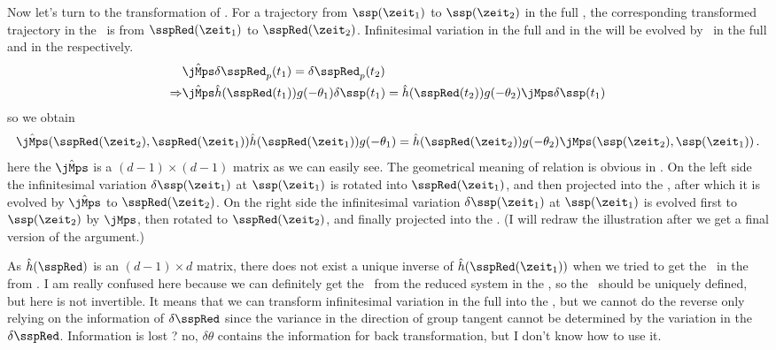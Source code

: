 Now let's turn to the transformation of {\cLvs}.
For a trajectory from $\ssp(\zeit_1)$ to $\ssp(\zeit_2)$ in the full {\statesp}, the
corresponding transformed trajectory in the \slice\ is from $\sspRed(\zeit_1)$
to $\sspRed(\zeit_2)$.
Infinitesimal variation in the full {\statesp} and in the
{\slice}  will be evolved by
\jacobianM\ in the full {\statesp} and in the {\slice} respectively.
\begin{align*}
 &\hat{\jMps}\delta \sspRed_{p}(t_1)=\delta \sspRed_{p}(t_2) \\
\Rightarrow & \hat{\jMps}\hat{h}(\sspRed(t_1))g(-\theta_1)\delta\ssp(t_1)=
\hat{h}(\sspRed(t_2))g(-\theta_2)\jMps\delta\ssp(t_1)
\end{align*}
so we obtain
\begin{equation}
  \label{eq:relation_jacobian1}
  \hat{\jMps}(\sspRed(\zeit_2),\sspRed(\zeit_1))\hat{h}
(\sspRed(\zeit_1))g(-\theta_{1})=
\hat{h}(\sspRed(\zeit_2))g(-\theta_{2})\jMps(\ssp(\zeit_2),\ssp(\zeit_1))
\,.
\end{equation}
here the $\hat{\jMps}$ is a $(d-1)\times (d-1)$ matrix as we can easily see.
The geometrical meaning of relation  is obvious
in . On the left side the
infinitesimal variation $\delta \ssp(\zeit_1)$ at $\ssp(\zeit_1)$ is rotated into
$\sspRed(\zeit_1)$, and then projected into the \slice, after which it is
evolved by $\hat{\jMps}$ to $\sspRed(\zeit_2)$. On the right side the
infinitesimal variation $\delta \ssp(\zeit_1)$ at $\ssp(\zeit_1)$ is evolved
first to $\ssp(\zeit_2)$
by $\jMps$, then rotated to $\sspRed(\zeit_2)$, and finally projected
into the \slice.
(I will redraw the illustration  after
we get a final version of the argument.)

As  $\hat{h}(\sspRed)$ is an $(d-1)\times d$ matrix, there does not exist
a unique inverse of $\hat{h}(\sspRed(\zeit_1))$ when we tried to get the
\jacobianM\ in the {\slice} from .
I am really confused here because we can definitely get the \jacobianM\
from the reduced system in the {\slice}, so the \jacobianM\ should be uniquely
defined, but here \refeq{eq:relation_jacobian1} is not invertible. It means
that we can transform infinitesimal variation in the full {\statesp} into
the {\slice}, but we cannot do the reverse only relying on the information of
$\delta \sspRed$ since the variance in the direction of group tangent
cannot be determined by the variation in the {\slice} $\delta \sspRed$.
Information is lost ? no, $\delta \theta$ contains the information for back
transformation, but I don't know how to use it.


